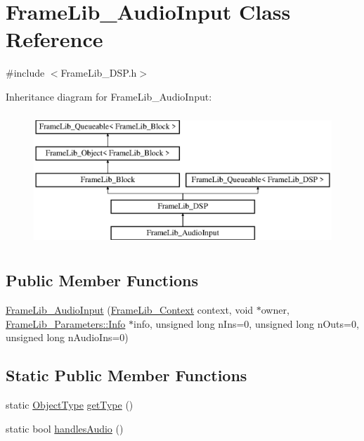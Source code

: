\hypertarget{class_frame_lib___audio_input}{}\section{Frame\+Lib\+\_\+\+Audio\+Input Class Reference}
\label{class_frame_lib___audio_input}


{\ttfamily \#include $<$Frame\+Lib\+\_\+\+D\+S\+P.\+h$>$}

Inheritance diagram for Frame\+Lib\+\_\+\+Audio\+Input\+:\begin{figure}[H]
\begin{center}
\leavevmode
\includegraphics[height=5.000000cm]{class_frame_lib___audio_input}
\end{center}
\end{figure}
\subsection*{Public Member Functions}
\begin{DoxyCompactItemize}
\item 
\hyperlink{class_frame_lib___audio_input_a5fcacfa38f33f949e76d046117835ace}{Frame\+Lib\+\_\+\+Audio\+Input} (\hyperlink{class_frame_lib___context}{Frame\+Lib\+\_\+\+Context} context, void $\ast$owner, \hyperlink{class_frame_lib___parameters_1_1_info}{Frame\+Lib\+\_\+\+Parameters\+::\+Info} $\ast$info, unsigned long n\+Ins=0, unsigned long n\+Outs=0, unsigned long n\+Audio\+Ins=0)
\end{DoxyCompactItemize}
\subsection*{Static Public Member Functions}
\begin{DoxyCompactItemize}
\item 
static \hyperlink{_frame_lib___types_8h_a842c5e2e69277690b064bf363c017980}{Object\+Type} \hyperlink{class_frame_lib___audio_input_a8a6f94b1530b3fd5b604d3151fad5220}{get\+Type} ()
\item 
static bool \hyperlink{class_frame_lib___audio_input_ad0586445ce01e95a3c832ecdc5dc1200}{handles\+Audio} ()
\end{DoxyCompactItemize}
